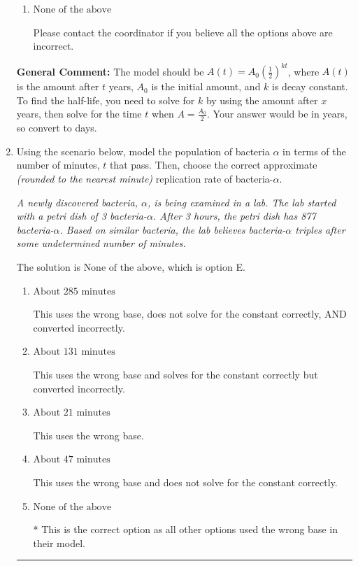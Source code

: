 \documentclass{extbook}[14pt]
\newcommand{\litem}[1]{\item #1

\rule{\textwidth}{0.4pt}}
\begin{document}
\begin{enumerate}
{\begin{enumerate}[label=\Alph*.]
* This is the correct option.
\item \( \text{None of the above} \)

Please contact the coordinator if you believe all the options above are incorrect.
\end{enumerate}

\textbf{General Comment:} The model should be $A(t) = A_0 (\frac{1}{2})^{kt}$, where $A(t)$ is the amount after $t$ years, $A_0$ is the initial amount, and $k$ is decay constant. To find the half-life, you need to solve for $k$ by using the amount after $x$ years, then solve for the time $t$ when $A = \frac{A_0}{2}$. Your answer would be in years, so convert to days.
}
\litem{
Using the scenario below, model the population of bacteria $\alpha$ in terms of the number of minutes, $t$ that pass. Then, choose the correct approximate \textit{(rounded to the nearest minute)} replication rate of bacteria-$\alpha$.

\begin{center}
    \textit{ A newly discovered bacteria, $\alpha$, is being examined in a lab. The lab started with a petri dish of 3 bacteria-$\alpha$. After 3 hours, the petri dish has 877 bacteria-$\alpha$. Based on similar bacteria, the lab believes bacteria-$\alpha$ triples after some undetermined number of minutes. }
\end{center}
The solution is \( \text{None of the above} \), which is option E.\begin{enumerate}[label=\Alph*.]
\item \( \text{About } 285 \text{ minutes} \)

This uses the wrong base, does not solve for the constant correctly, AND converted incorrectly.
\item \( \text{About } 131 \text{ minutes} \)

This uses the wrong base and solves for the constant correctly but converted incorrectly.
\item \( \text{About } 21 \text{ minutes} \)

This uses the wrong base.
\item \( \text{About } 47 \text{ minutes} \)

This uses the wrong base and does not solve for the constant correctly.
\item \( \text{None of the above} \)

* This is the correct option as all other options used the wrong base in their model.
\end{enumerate}

}
\end{enumerate}
\end{document}
